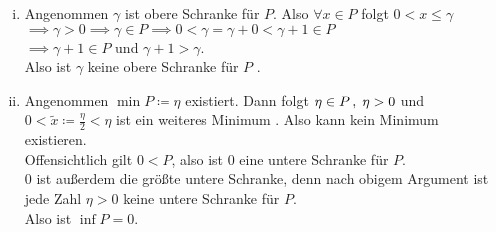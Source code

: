 \documentclass[../ana1.tex]{subfiles}
\begin{document}
\begin{bew}\leavevmode
	\begin{enumerate}[(i)]
		\item Angenommen \(\gamma \) ist obere Schranke für \(P \). Also \(\forall x \in P \) folgt \( 0 < x \leq \gamma \) \\
			  \(\implies \gamma > 0 \implies \gamma \in P \implies 0 < \gamma = \gamma + 0 < \gamma + 1 \in P \) \\
			  \(\implies \gamma + 1 \in P \) und \(\gamma + 1 > \gamma \). \\
			  Also ist \(\gamma \) keine obere Schranke für \(P \) \Lightning.
		\item Angenommen \(\min P \coloneqq \eta \) existiert. Dann folgt \( \eta \in P \operatorname{,}  \; \eta > 0 \) und
		      \(0 < \tilde{x} \coloneqq \frac{\eta}{2} < \eta \) ist ein weiteres Minimum \Lightning. Also kann kein Minimum existieren. \\
			  Offensichtlich gilt \(0 < P \), also ist \(0 \) eine untere Schranke für \(P \). \\
			  \(0 \) ist außerdem die größte untere Schranke, denn nach obigem Argument ist jede Zahl \(\eta > 0 \) keine untere Schranke für \(P \). \\
			  Also ist \(\inf P = 0 \). \qedhere
	\end{enumerate}
\end{bew}
\end{document}
